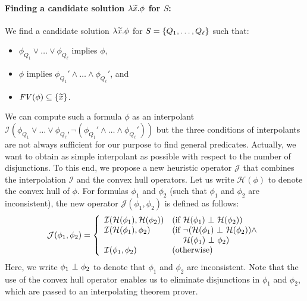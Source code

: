\paragraph{Finding a candidate solution \(\lambda \widetilde{x}.\phi\) for \(S\):}
We find a candidate solution \(\lambda \widetilde{x}.\phi\) for \(S =
\{{Q_1,\dots,Q_{\ell}}\}\) such that:
\vspace{-4pt}
\begin{itemize}
\item \(\phi_{Q_1} \lor \dots \lor \phi_{Q_{\ell}}\) implies \(\phi\),
\item \(\phi\) implies \(\phi_{Q_1}' \land \dots \land \phi_{Q_{\ell}}'\), and
\item \(\mathit{FV}({\phi}) \subseteq \{{\widetilde{x}}\}\).
\end{itemize}
\vspace{-4pt}
We can compute such a formula \(\phi\) as an interpolant
\(\mathcal{I}(\phi_{Q_1} \lor \dots \lor \phi_{Q_{\ell}},\neg
(\phi_{Q_1}' \land \dots \land \phi_{Q_{\ell}}'))\) but the three
conditions of interpolants are not always sufficient for our purpose to
find general predicates.  Actually, we want to obtain as simple
interpolant as possible with respect to the number of disjunctions.
To this end, we propose a new heuristic operator \(\mathcal{J}\) that
combines the interpolation \(\mathcal{I}\) and the convex hull operators.
 Let us write \(\mathcal{H}(\phi)\) to denote the convex hull of \(\phi\).
 For formulas \(\phi_1\) and \(\phi_2\) (such that \(\phi_1\) and
\(\phi_2\) are inconsistent), the new operator
\(\mathcal{J}(\phi_1,\phi_2)\) is defined as follows:
\[
\mathcal{J}(\phi_1,\phi_2) =
\left\{
\begin{array}{ll}
\mathcal{I}(\mathcal{H}(\phi_1),\mathcal{H}(\phi_2)) & (\mbox{if~}\mathcal{H}(\phi_1) \ \bot\  \mathcal{H}(\phi_2)) \\
\mathcal{I}(\mathcal{H}(\phi_1),\phi_2) & (\mbox{if~}\neg (\mathcal{H}(\phi_1) \ \bot\  \mathcal{H}(\phi_2)) \land \\
&\ \quad \mathcal{H}(\phi_1) \ \bot\  \phi_2) \\
\mathcal{I}(\phi_1,\phi_2) & (\mbox{otherwise})
\end{array}
\right.
\]
Here, we write \(\phi_1 \ \bot\  \phi_2\) to denote that \(\phi_1\) and
\(\phi_2\) are inconsistent.  Note that the use of the convex hull
operator enables us to eliminate disjunctions in \(\phi_1\) and
\(\phi_2\), which are passed to an interpolating theorem prover.
